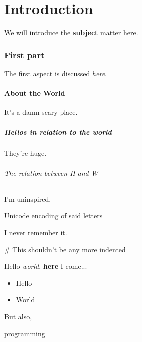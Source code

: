 \documentclass{article}
\begin{document}
\part*{Introduction}

We will introduce the \textbf{subject} matter here.

\section*{First part}

The first aspect is discussed \textit{here}.

\subsection*{About the World}

It's a damn scary place.

\subsubsection*{Hellos in relation to the world}

They're huge.

\paragraph{The relation between H and W}\mbox{}\newline

I'm uninspired.

\subparagraph{Unicode encoding of said letters}\mbox{}\newline

I never remember it.

\subparagraph{\# This shouldn't be any more indented}\mbox{}\newline

Hello \textit{world}, \textbf{here} I come...


\begin{itemize}
\item  Hello
\item  World

\end{itemize}

But also,

    programming
\end{document}
